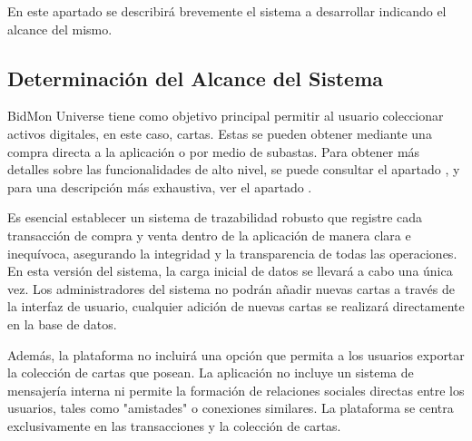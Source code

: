 En este apartado se describirá brevemente el sistema a desarrollar indicando el alcance del mismo.
\subsection{Determinación del Alcance del Sistema}
BidMon Universe tiene como objetivo principal permitir al usuario coleccionar activos digitales, en este caso, cartas. Estas se pueden obtener mediante una compra directa a la aplicación o 
por medio de subastas. Para obtener más detalles sobre las funcionalidades de alto nivel, se puede consultar el apartado 
, y para una descripción más exhaustiva, 
ver el apartado .

Es esencial establecer un sistema de trazabilidad robusto que registre cada transacción de compra y venta dentro de la aplicación de manera clara e inequívoca, asegurando la integridad y 
la transparencia de todas las operaciones.
En esta versión del sistema, la carga inicial de datos se llevará a cabo una única vez. Los administradores del sistema no podrán añadir nuevas cartas a través de la interfaz de usuario, 
cualquier adición de nuevas cartas se realizará directamente en la base de datos. 

Además, la plataforma no incluirá una opción que permita a los usuarios exportar la colección de cartas que posean.
La aplicación no incluye un sistema de mensajería interna ni permite la formación de relaciones sociales directas entre los usuarios, tales como "amistades" o conexiones similares. 
La plataforma se centra exclusivamente en las transacciones y la colección de cartas.



